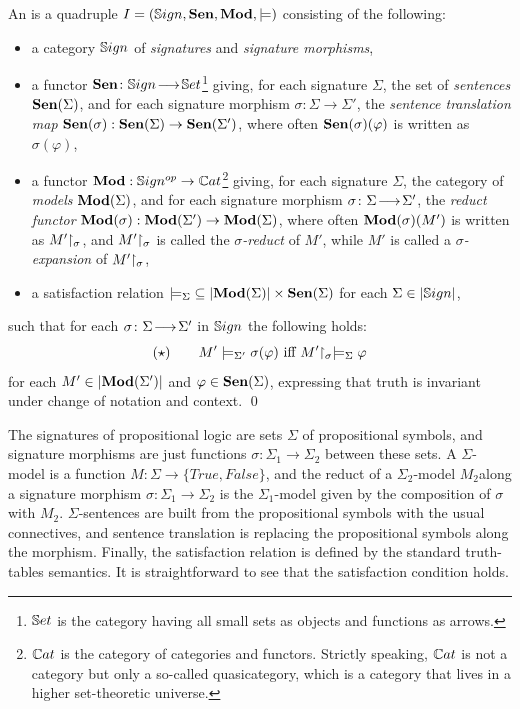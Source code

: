\documentclass[10pt,fleqn,%
\ifpretendfinal
final%
\else
draft%
\fi,
]{scrreprt}
\begin{document}
\begin{definition}\label{def:inst} An
 \cite{Institutions} is a quadruple $I=(\mathbb{S}ign,\mathbf {Sen},\mathbf{Mod},{\models})$
consisting of the following:
%
\begin{itemize}
\item a category $\mathbb{S}ign$ of \emph{signatures} and \emph{signature morphisms},
\item a functor $\mathbf {Sen}\colon\mathbb{S}ign\!\longrightarrow\!\mathbb{S}et$\footnote{$\mathbb{S}et$ is the
category having all small \textsc{}sets as objects and functions as
arrows.}  giving, for each signature $\Sigma$, the set of
\emph{sentences} $\mathbf {Sen}(\Sigma)$, and for each signature morphism
$\sigma:{\Sigma}\to{\Sigma'}$, the \emph{sentence translation map}
$\mathbf {Sen}(\sigma):{\mathbf {Sen}(\Sigma)}\to{\mathbf {Sen}(\Sigma')}$, where often
$\mathbf {Sen}(\sigma)(\varphi)$ is written as $\sigma(\varphi)$, \item a
functor $\mathbf{Mod}:{\mathbb{S}ign^{op}}\to{\mathbb{C}at}$\footnote {$\mathbb{C}at$ is the category
of categories and functors. Strictly speaking, $\mathbb{C}at$ is not a
category but only a so-called quasicategory, which is a category that
lives in a higher set-theoretic universe.} giving, for each signature
$\Sigma$, the category of \emph{models} $\mathbf{Mod}(\Sigma)$, and for each
signature morphism $\sigma\colon\Sigma\!\longrightarrow\!\Sigma'$, the \emph{reduct
functor\/} $\mathbf{Mod}(\sigma):{\mathbf{Mod}(\Sigma')}\to {\mathbf{Mod}(\Sigma)}$, where
often $\mathbf{Mod}(\sigma)(M')$ is written as $M'\hspace{-.3em}\upharpoonright_{\sigma}$, and
$M'\hspace{-.3em}\upharpoonright_{\sigma}$ is called the \emph{$\sigma$-reduct} of $M'$,
while $M'$ is called a \emph{$\sigma$-expansion} of
$M'\hspace{-.3em}\upharpoonright_{\sigma}$,
\item a satisfaction relation
${\models_{\Sigma}}\subseteq|{\mathbf{Mod}(\Sigma)|\times\mathbf {Sen}(\Sigma)}$ for
each $\Sigma\in |\mathbb{S}ign|$,
\end{itemize}
%
such that for each $\sigma\colon\Sigma\!\longrightarrow\!\Sigma'$ in $\mathbb{S}ign$ the following  holds:
$$
(\star) \qquad M'\models_{\Sigma'}\sigma(\varphi) \mbox{ iff }
M'\hspace{-.3em}\upharpoonright_{\sigma} \models_{\Sigma} \varphi
$$
for each $M'\in |\mathbf{Mod}(\Sigma')|$ and $\varphi\in \mathbf {Sen}(\Sigma)$,
expressing that truth is invariant under change of notation and
context.  \qed
\end{definition}

\begin{definition}\label{Prop}
The signatures of propositional logic are sets $\Sigma$ of propositional symbols, and signature morphisms are just
functions $\sigma:{\Sigma_1}\to{\Sigma_2}$ between these sets. 
A $\Sigma$-model is a function $M : {\Sigma}\to{\{True, False\}}$, and the reduct of a 
$\Sigma_2$-model $M_2$along a signature morphism $\sigma:{\Sigma_1}\to{\Sigma_2}$ is 
the $\Sigma_1$-model given by the composition of $\sigma$ with $M_2$. $\Sigma$-sentences are built from the
propositional symbols with the usual connectives, and sentence translation is replacing the propositional
symbols along the morphism. Finally, the satisfaction relation is defined by the standard truth-tables
semantics. It is straightforward to see that the satisfaction condition holds.
\end{definition}
\end{document}
